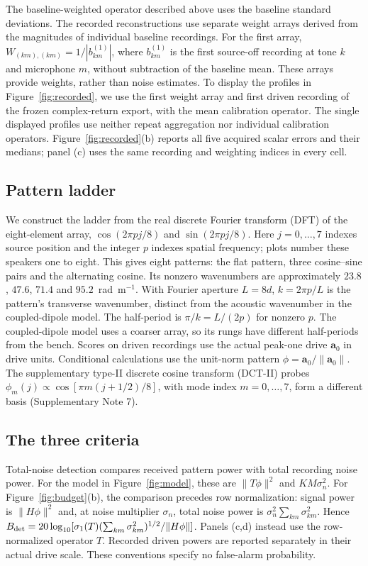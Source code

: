\documentclass[lineno,pdflatex,sn-nature]{sn-jnl}%
\theoremstyle{thmstyleone}%
\theoremstyle{thmstyletwo}%
\theoremstyle{thmstylethree}%
\begin{document}
The baseline-weighted operator described above uses the baseline standard deviations. The recorded reconstructions use separate weight arrays derived from the magnitudes of individual baseline recordings. For the first array, $W_{(km),(km)}=1/|b^{(1)}_{km}|$, where $b^{(1)}_{km}$ is the first source-off recording at tone $k$ and microphone $m$, without subtraction of the baseline mean. These arrays provide weights, rather than noise estimates. To display the profiles in Figure~\ref{fig:recorded}, we use the first weight array and first driven recording of the frozen complex-return export, with the mean calibration operator. The single displayed profiles use neither repeat aggregation nor individual calibration operators. Figure~\ref{fig:recorded}(b) reports all five acquired scalar errors and their medians; panel (c) uses the same recording and weighting indices in every cell.


\subsection{Pattern ladder}

We construct the ladder from the real discrete Fourier transform (DFT) of the eight-element array, $\cos(2\pi pj/8)$ and $\sin(2\pi pj/8)$. Here $j=0,\ldots,7$ indexes source position and the integer $p$ indexes spatial frequency; plots number these speakers one to eight. This gives eight patterns: the flat pattern, three cosine--sine pairs and the alternating cosine. Its nonzero wavenumbers are approximately $23.8$, $47.6$, $71.4$ and $95.2$~rad~m$^{-1}$. With Fourier aperture $L=8d$, $k=2\pi p/L$ is the pattern's transverse wavenumber, distinct from the acoustic wavenumber in the coupled-dipole model. The half-period is $\pi/k=L/(2p)$ for nonzero $p$. The coupled-dipole model uses a coarser array, so its rungs have different half-periods from the bench. Scores on driven recordings use the actual peak-one drive $\mathbf a_0$ in drive units. Conditional calculations use the unit-norm pattern $\phi=\mathbf a_0/\|\mathbf a_0\|$. The supplementary type-II discrete cosine transform (DCT-II) probes $\phi_m(j)\propto\cos[\pi m(j+1/2)/8]$, with mode index $m=0,\ldots,7$, form a different basis (Supplementary Note 7).


\subsection{The three criteria}

Total-noise detection compares received pattern power with total recording noise power. For the model in Figure~\ref{fig:model}, these are $\|T\phi\|^2$ and $KM\sigma_n^2$. For Figure~\ref{fig:budget}(b), the comparison precedes row normalization: signal power is $\|H\phi\|^2$ and, at noise multiplier $\sigma_n$, total noise power is $\sigma_n^2\sum_{km}\sigma_{km}^2$. Hence $B_{\rm det}=20\log_{10}[\sigma_1(T)(\sum_{km}\sigma_{km}^2)^{1/2}/\|H\phi\|]$. Panels (c,d) instead use the row-normalized operator $T$. Recorded driven powers are reported separately in their actual drive scale. These conventions specify no false-alarm probability.
\end{document}
